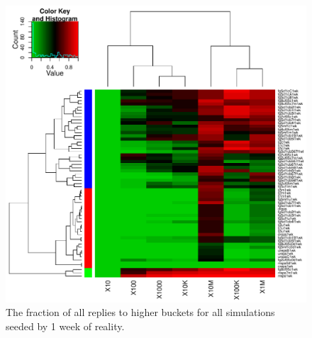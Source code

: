 \documentclass[10pt,oneside]{memoir}
\begin{document}
\begin{Spacing}{2}
\begin{figure}
\begin{center}
    \includegraphics{figures/crop/heatmap-b2br-befr-rel-medians-1wk}
    \caption{The fraction of all replies to higher buckets for all simulations seeded by 1 week of reality.}
    \label{figure:heatmap-b2br-befr-rel-medians-1wk}
\end{center}
\end{figure}


\end{Spacing}
\end{document}
